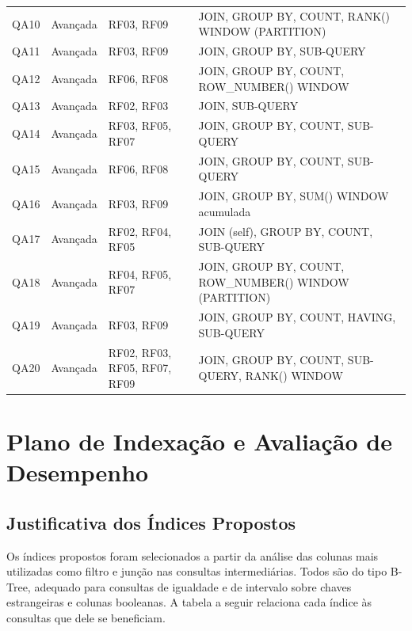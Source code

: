 \documentclass[12pt]{article}
\begin{document}
\begin{longtable}{|c|l|l|p{6.5cm}|}
QA10 & Avançada & RF03, RF09 & JOIN, GROUP BY, COUNT, RANK() WINDOW (PARTITION) \\
QA11 & Avançada & RF03, RF09 & JOIN, GROUP BY, SUB-QUERY \\
QA12 & Avançada & RF06, RF08 & JOIN, GROUP BY, COUNT, ROW\_NUMBER() WINDOW \\
QA13 & Avançada & RF02, RF03 & JOIN, SUB-QUERY \\
QA14 & Avançada & RF03, RF05, RF07 & JOIN, GROUP BY, COUNT, SUB-QUERY \\
QA15 & Avançada & RF06, RF08 & JOIN, GROUP BY, COUNT, SUB-QUERY \\
QA16 & Avançada & RF03, RF09 & JOIN, GROUP BY, SUM() WINDOW acumulada \\
QA17 & Avançada & RF02, RF04, RF05 & JOIN (self), GROUP BY, COUNT, SUB-QUERY \\
QA18 & Avançada & RF04, RF05, RF07 & JOIN, GROUP BY, COUNT, ROW\_NUMBER() WINDOW (PARTITION) \\
QA19 & Avançada & RF03, RF09 & JOIN, GROUP BY, COUNT, HAVING, SUB-QUERY \\
QA20 & Avançada & RF02, RF03, RF05, RF07, RF09 & JOIN, GROUP BY, COUNT, SUB-QUERY, RANK() WINDOW \\
\hline
\end{longtable}
\normalsize

\section{Plano de Indexação e Avaliação de Desempenho}
\label{sec:indexacao}

\subsection{Justificativa dos Índices Propostos}
\label{subsec:indices-justif}
Os índices propostos foram selecionados a partir da análise das colunas mais utilizadas como filtro e junção nas consultas intermediárias. Todos são do tipo B-Tree, adequado para consultas de igualdade e de intervalo sobre chaves estrangeiras e colunas booleanas. A tabela a seguir relaciona cada índice às consultas que dele se beneficiam.
\end{document}
